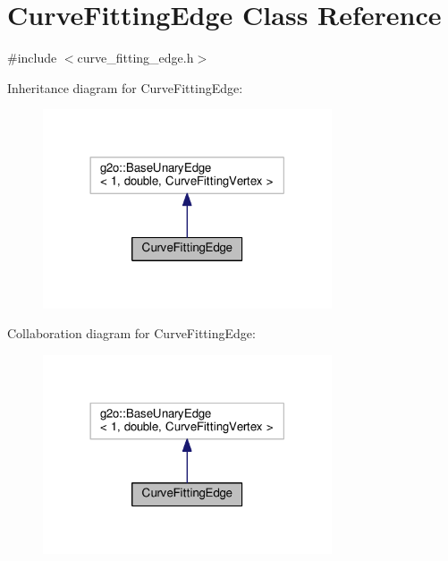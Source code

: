 \hypertarget{classCurveFittingEdge}{}\section{Curve\+Fitting\+Edge Class Reference}
\label{classCurveFittingEdge}


{\ttfamily \#include $<$curve\+\_\+fitting\+\_\+edge.\+h$>$}



Inheritance diagram for Curve\+Fitting\+Edge\+:\nopagebreak
\begin{figure}[H]
\begin{center}
\leavevmode
\includegraphics[width=242pt]{classCurveFittingEdge__inherit__graph}
\end{center}
\end{figure}


Collaboration diagram for Curve\+Fitting\+Edge\+:\nopagebreak
\begin{figure}[H]
\begin{center}
\leavevmode
\includegraphics[width=242pt]{classCurveFittingEdge__coll__graph}
\end{center}
\end{figure}
